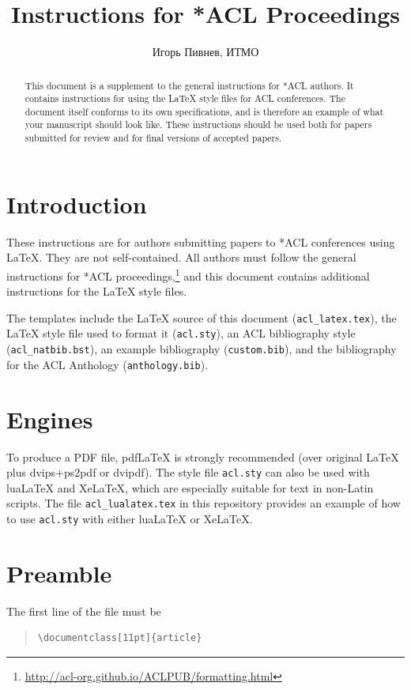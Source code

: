 \documentclass[11pt]{article}
\title{Instructions for *ACL Proceedings}
\author{Игорь Пивнев, ИТМО}
\begin{document}
\maketitle

\begin{abstract}
This document is a supplement to the general instructions for *ACL authors. It contains instructions for using the \LaTeX{} style files for ACL conferences.
The document itself conforms to its own specifications, and is therefore an example of what your manuscript should look like.
These instructions should be used both for papers submitted for review and for final versions of accepted papers.
\end{abstract}

\section{Introduction}

These instructions are for authors submitting papers to *ACL conferences using \LaTeX. They are not self-contained. All authors must follow the general instructions for *ACL proceedings,\footnote{\url{http://acl-org.github.io/ACLPUB/formatting.html}} and this document contains additional instructions for the \LaTeX{} style files.

The templates include the \LaTeX{} source of this document (\texttt{acl\_latex.tex}),
the \LaTeX{} style file used to format it (\texttt{acl.sty}),
an ACL bibliography style (\texttt{acl\_natbib.bst}),
an example bibliography (\texttt{custom.bib}),
and the bibliography for the ACL Anthology (\texttt{anthology.bib}).

\section{Engines}

To produce a PDF file, pdf\LaTeX{} is strongly recommended (over original \LaTeX{} plus dvips+ps2pdf or dvipdf).
The style file \texttt{acl.sty} can also be used with
lua\LaTeX{} and
Xe\LaTeX{}, which are especially suitable for text in non-Latin scripts.
The file \texttt{acl\_lualatex.tex} in this repository provides
an example of how to use \texttt{acl.sty} with either
lua\LaTeX{} or
Xe\LaTeX{}.

\section{Preamble}

The first line of the file must be
\begin{quote}
\begin{verbatim}
\documentclass[11pt]{article}
\end{verbatim}
\end{quote}
\end{document}
